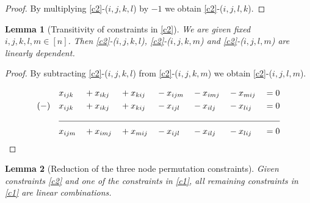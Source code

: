 \documentclass{scrartcl}
\newtheorem{lemma}{Lemma}
\theoremstyle{plain}
\begin{document}
\begin{proof}
	By multiplying \eqref{c2}-($i,j,k,l$) by $-1$ we obtain \eqref{c2}-($i,j,l,k$).
\end{proof}

\begin{mdframed}
	\begin{lemma}[Transitivity of constraints in \ref{c2}] \label{lemtrans}
		We are given fixed $i,j,k,l,m \in [n]$. Then \eqref{c2}-($i,j,k,l$), \eqref{c2}-($i,j,k,m$) and \eqref{c2}-($i,j,l,m$) are linearly dependent.
	\end{lemma}
	\vspace{7pt}
\end{mdframed}

\begin{proof}
	By subtracting \eqref{c2}-($i,j,k,l$) from \eqref{c2}-($i,j,k,m$) we obtain \eqref{c2}-($i,j,l,m$).
	
	\begin{align*}
	& &&x_{ijk} &&+x_{ikj} &&+ x_{kij} &&- x_{ijm} &&- x_{imj} &&- x_{mij} &&= 0 \\
	&(-) &&x_{ijk} &&+ x_{ikj} &&+ x_{kij} &&- x_{ijl} &&- x_{ilj} &&- x_{lij} &&= 0 \\
	\cline{3-16}
	& &&x_{ijm} &&+ x_{imj} &&+ x_{mij} &&- x_{ijl} &&- x_{ilj} &&- x_{lij} &&= 0 \\
	\end{align*}
\end{proof}

\newpage
\begin{mdframed}
\begin{lemma}[Reduction of the three node permutation constraints]
	Given constraints \eqref{c2} and one of the constraints in \eqref{c1}, all remaining constraints in \eqref{c1} are linear combinations.
\end{lemma}
\vspace{7pt}
\end{mdframed}
\end{document}
